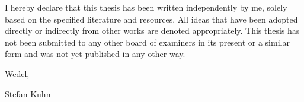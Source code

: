 \label{cha:aff}
I hereby declare that this thesis has been written independently by me, solely based on the specified literature and resources. All ideas that have been adopted directly or indirectly from other works are denoted appropriately. This thesis has not been submitted to any other board of examiners in its present or a similar form and was not yet published in any other way.

\bigskip

Wedel, \Datum

\vspace{5ex}

\begin{center}
Stefan Kuhn
\end{center}
